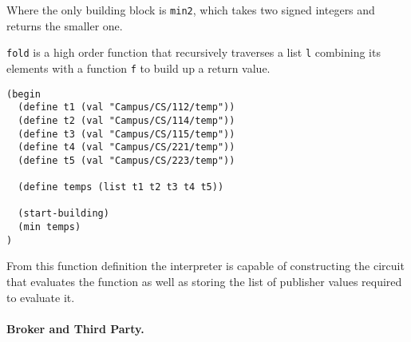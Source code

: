 Where the only \libgarble building block is \texttt{min2}, which takes two
signed integers and returns the smaller one.

\texttt{fold} is a high order function that recursively traverses a list
\texttt{l} combining its elements with a function \texttt{f} to build up a
return value.

\begin{lstlisting}
(begin
  (define t1 (val "Campus/CS/112/temp"))
  (define t2 (val "Campus/CS/114/temp"))
  (define t3 (val "Campus/CS/115/temp"))
  (define t4 (val "Campus/CS/221/temp"))
  (define t5 (val "Campus/CS/223/temp"))

  (define temps (list t1 t2 t3 t4 t5))

  (start-building)
  (min temps)
)
\end{lstlisting}

From this function definition the interpreter is capable of constructing the circuit that evaluates the function as well as storing the list of publisher values required to evaluate it.


\paragraph{Broker and Third Party.}




